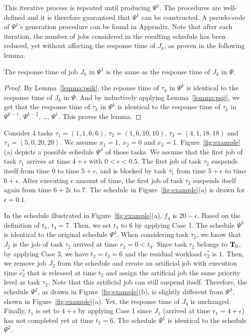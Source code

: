 This iterative process is repeated until producing $\Psi^1$. The procedures are well-defined and it is therefore guaranteed that $\Psi^1$ can be constructed. A pseudo-code of $\Psi^1$'s generation procedure can be found in Appendix\citetechreport{}. Note that after each iteration, the number of jobs considered in the resulting schedule has been reduced, yet without affecting the response time of $J_k$, as proven in the following lemma.

 \begin{Lemma}
\label{lem:step-1-conclusion}
 The response time of job $J_k$ in $\Psi^1$ is the same as the response time of $J_k$ in $\Psi$.
\end{Lemma}
\begin{proof}
  By Lemma~\ref{lemma:psik}, the reponse time of $\tau_k$ in $\Psi^k$ is identical to the response time of $J_k$ in $\Psi$. And by inductively applying Lemma~\ref{lemma:psij}, we get that the response time of $\tau_k$ in $\Psi^k$ is identical to the response time of $\tau_k$ in $\Psi^{k-1}$, $\Psi^{k-2}$, \ldots, $\Psi^{1}$. This proves the lemma.
\end{proof}


\begin{example}
\label{ex:proof_step1}
Consider 4 tasks $\tau_1 =(1,1,6,6)$, $\tau_2 =(1,6,10,10)$, $\tau_3 =(4,1,18,18)$ and $\tau_4 =(5,0,20,20)$.
We assume $x_1=1$, $x_2=0$ and $x_3=1$.
Figure~\ref{fig:example}(a) depicts a possible schedule $\Psi^4$ of those tasks. We assume that the first job of task $\tau_1$ arrives
at time $4+\epsilon$ with $0 < \epsilon < 0.5$. The first job
of task $\tau_2$ suspends itself from time $0$ to time $5+\epsilon$,
and is blocked by task $\tau_1$ from time $5+\epsilon$ to time
$6+\epsilon$. After executing $\epsilon$ amount
of time, the first job of task $\tau_2$ suspends itself again from
time $6+2\epsilon$ to $7$. The schedule in Figure~\ref{fig:example}(a) is drawn for $\epsilon=0.1$.
   
In the schedule illustrated in Figure~\ref{fig:example}(a), $f_4$ is
$20-\epsilon$.  Based on the definition of $t_k$, $t_4=7$. Then, we set $t_3$ to $6$ by applying Case 1. The
schedule $\Psi^3$ is identical to the original schedule $\Psi^4$. When considering task $\tau_2$, we know that $J_2$ is the job of task
$\tau_2$ arrived at time $r_2 = 0 < t_3$. Since task $\tau_2$ belongs to ${\bf
  T}_0$, by applying Case 3, we have $t_2=t_3=6$ and the
residual workload $c_2^*$ is $1$. Then, we remove job $J_2$ from the
schedule and create an artificial job with execution time $c_2^*$ that
is released at time $t_2$ and assign the artificial job the same priority level as task
$\tau_2$. Note that this artificial job can still suspend itself. Therefore, the schedule $\Psi^2$, as drawn in 
Figure~\ref{fig:example}(b), is slightly different from $\Psi^3$, shown in Figure~\ref{fig:example}(a). Yet, the response time of $J_4$ is unchanged. Finally, $t_1$ is set to $4+\epsilon$ by applying Case 1 since
$J_1$ (arrived at time $r_1=4+\epsilon$) has not completed yet at time
$t_2=6$.  The schedule $\Psi^1$ is identical to the schedule
$\Psi^2$.
\myendproof
\end{example}


